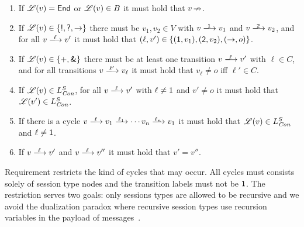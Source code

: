 \begin{enumerate}

  \item \label{tylts/arity0} If $\mathscr{L}(v) = \textsf{End}$ or $\mathscr{L}(v) \in B$ it must
    hold that $v\,{\nrightarrow}$.

  \item \label{tylts/arity2} If $\mathscr{L}(v) \in \{\textsf{!},\textsf{?},{\to}\}$ there
    must be $v_1,v_2\in V$ with $v \sttrans\Lone v_1$ and $v \sttrans\Ltwo
    v_2$, and for all $v \sttrans\ell v'$ it must hold that
    $(\ell,v')\in\{(\textsf{1},v_1),(\textsf{2},v_2),({\to},o)\}$.

  \item \label{tylts/choice-branch} If $\mathscr{L}(v)\in\{\textsf{+},\textsf{\&}\}$ there
    must be at least one transition $v\sttrans\ell v'$ with $\ell\in C$, and
    for all transitions $v\sttrans{\ell'} v_\ell$ it must hold that $v_\ell \ne
    o$ iff $\ell'\in C$.

  \item \label{tylts/well-formed} If $\mathscr{L}(v)\in L_{\textit{Con}}^S$, for all
    $v\sttrans\ell v'$ with $\ell \ne \textsf{1}$ and $v' \ne o$ it must hold that
    $\mathscr{L}(v')\in L_{\textit{Con}}^S$.

  \item \label{tylts/cycles} If there is a cycle $v \sttrans{\ell} v_1
    \sttrans{\ell_1} \cdots v_n \sttrans{\ell_n} v_1$ it must hold that
    $\mathscr{L}(v)\in L_{\textit{Con}}^S$ and $\ell\ne\textsf{1}$.

  \item \label{tylts/det} If $v\sttrans\ell v'$ and $v\sttrans\ell v''$ it must
    hold that $v'=v''$.

\end{enumerate}
%
Requirement  restricts the kind of cycles that may occur.
All cycles must consists solely of session type nodes and the transition labels
must not be $\textsf{1}$. The restriction serves two goals: only sessions types are
allowed to be recursive and we avoid the dualization paradox where recursive
session types use recursion variables in the payload of
messages~\citep{BernardiH16,DBLP:journals/corr/abs-2004-01322}.

